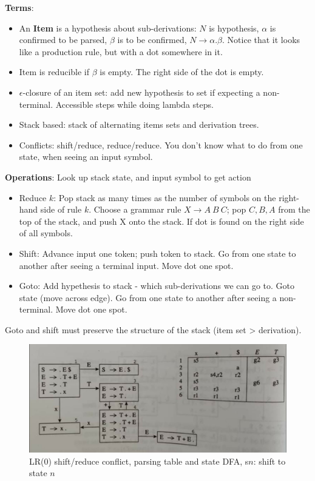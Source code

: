 \textbf{Terms}:
\begin{itemize}
    \item An \textbf{Item} is a hypothesis about sub-derivations: $N$ is hypothesis, $\alpha$ is confirmed to be parsed, $\beta$ is to be confirmed, $N \rightarrow \alpha.\beta$. Notice that it looks like a production rule, but with a dot somewhere in it.
    \item Item is reducible if $\beta$ is empty. The right side of the dot is empty.
    \item $\epsilon$-closure of an item set: add new hypothesis to set if expecting a non-terminal. Accessible steps while doing lambda steps.
    \item Stack based: stack of alternating items sets and derivation trees.
    \item Conflicts: shift/reduce, reduce/reduce. You don't know what to do from one state, when seeing an input symbol.
\end{itemize}

\textbf{Operations}: Look up stack state, and input symbol to get action
\begin{itemize}
    \item Reduce $k$: Pop stack as many times as the number of symbols on the right-hand side of rule $k$. Choose a grammar rule $X \rightarrow A\ B\ C$; pop $C, B, A$ from the top of the stack, and push X onto the stack. If dot is found on the right side of all symbols.
    \item Shift: Advance input one token; push token to stack. Go from one state to another after seeing a terminal input. Move dot one spot.
    \item Goto: Add hypethesis to stack - which sub-derivations we can go to. Goto state (move across edge). Go from one state to another after seeing a non-terminal. Move dot one spot.
\end{itemize}

Goto and shift must preserve the structure of the stack (item set > derivation). \\

\begin{figure}[h]
    \centering
    \includegraphics[width=\textwidth]{assets/parsingdfa_table.jpg}
    \caption{LR(0) shift/reduce conflict, parsing table and state DFA, s$n$: shift to state $n$}
    \label{shift/reduce}
\end{figure}

